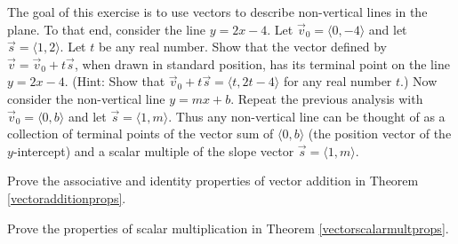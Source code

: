 \documentclass{ximera}
\begin{document}
\begin{problem} \label{2dvectorsgiveuslines}
The goal of this exercise is to use vectors to describe non-vertical lines in the plane.  To that end, consider the line $y = 2x - 4$. Let $\overrightarrow{v}_0 = \langle 0, -4 \rangle$ and let $\overrightarrow{s} = \langle 1, 2 \rangle$.  Let $t$ be any real number.  Show that the vector defined by $\overrightarrow{v} = \overrightarrow{v}_0 + t\overrightarrow{s}$, when drawn in standard position, has its terminal point on the line $y = 2x - 4$.  (Hint: Show that $\overrightarrow{v}_0 + t\overrightarrow{s} = \langle t, 2t - 4 \rangle$ for any real number $t$.)  Now consider the non-vertical line $y = mx + b$.  Repeat the previous analysis with  $\overrightarrow{v}_0 = \langle 0, b \rangle$ and let $\overrightarrow{s} = \langle 1, m \rangle$.  Thus any non-vertical line can be thought of as a collection of terminal points of the vector sum of $\langle 0, b \rangle$ (the position vector of the $y$-intercept) and a scalar multiple of the slope vector $\overrightarrow{s} = \langle 1, m \rangle$.
\end{problem}
 

\begin{problem}
Prove the associative and identity properties of vector addition in Theorem \ref{vectoradditionprops}.
\end{problem}

\begin{problem}
Prove the properties of scalar multiplication in Theorem \ref{vectorscalarmultprops}. 
\end{problem}
\end{document}
